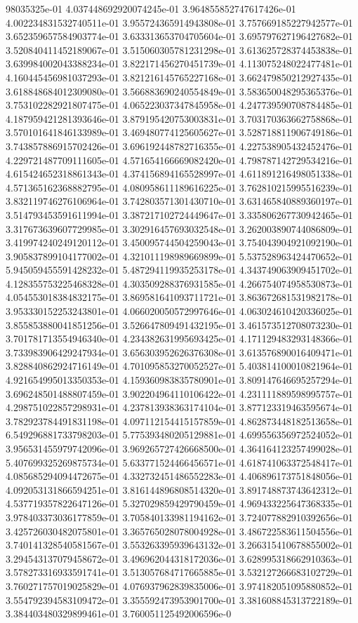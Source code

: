 98035325e-01	4.037448692920074245e-01	3.964855852747617426e-01	4.002234831532740511e-01	3.955724365914943808e-01	3.757669185227942577e-01	3.652359657584903774e-01	3.633313653704705604e-01	3.695797627196427682e-01	3.520840411452189067e-01	3.515060305781231298e-01	3.613625728374453838e-01	3.639984002043388234e-01	3.822171456270451739e-01	4.113075248022477481e-01	4.160445456981037293e-01	3.821216145765227168e-01	3.662479850212927435e-01	3.618848684012309080e-01	3.566883690240554849e-01	3.583650048295365376e-01	3.753102282921807475e-01	4.065223037347845958e-01	4.247739590708784485e-01	4.187959421281393646e-01	3.879195420753003831e-01	3.703170363662758868e-01	3.570101641846133989e-01	3.469480774125605627e-01	3.528718811906749186e-01	3.743857886915702426e-01	3.696192448782716355e-01	4.227538905432452476e-01	4.229721487709111605e-01	4.571654166669082420e-01	4.798787142729534216e-01	4.615424652318861343e-01	4.374156894165528997e-01	4.611891216498051338e-01	4.571365162368882795e-01	4.080958611189616225e-01	3.762810215995516239e-01	3.832119746276106964e-01	3.742803571301430710e-01	3.631465840889360197e-01	3.514793453591611994e-01	3.387217102724449647e-01	3.335806267730942465e-01	3.317673639607729985e-01	3.302916457693032548e-01	3.262003890744086809e-01	3.419974240249120112e-01	3.450095744504259043e-01	3.754043904921092190e-01	3.905837899104177002e-01	4.321011198989669899e-01	5.537528963424470652e-01	5.945059455591428232e-01	5.487294119935253178e-01	4.343749063909451702e-01	4.128355753225468328e-01	4.303509288376931585e-01	4.266754074958530873e-01	4.054553018384832175e-01	3.869581641093711721e-01	3.863672681531982178e-01	3.953330152253243801e-01	4.066020050572997646e-01	4.063024610420336025e-01	3.855853880041851256e-01	3.526647809491432195e-01	3.461573512708073230e-01	3.701781713554946340e-01	4.234382631995693425e-01	4.171129483293148366e-01	3.733983906429247934e-01	3.656303952626376308e-01	3.613576890016409471e-01	3.828840862924716149e-01	4.701095853270052527e-01	5.403814100010821964e-01	4.921654995013350353e-01	4.159360983835780901e-01	3.809147646695257294e-01	3.696248501488807459e-01	3.902204964110106422e-01	4.231111889598995757e-01	4.298751022857298931e-01	4.237813938363174104e-01	3.877123319463595674e-01	3.782923784491831198e-01	4.097112154415157859e-01	4.862873448182513658e-01	6.549296881733798203e-01	5.775393480205129881e-01	4.699556356972524052e-01	3.956531455979742096e-01	3.969265727426668500e-01	4.364164123257499028e-01	5.407699325269875734e-01	5.633771524466456571e-01	4.618741063372548417e-01	4.085685294094472675e-01	4.332732451486552283e-01	4.406896173751848056e-01	4.092053131866594251e-01	3.816144896808514320e-01	3.891748873743642312e-01	4.537719357822647126e-01	5.327029859429790459e-01	4.969433225647368335e-01	3.978403373036177859e-01	3.705840133981194162e-01	3.724077882910392656e-01	3.425726030482075801e-01	3.365765028078004928e-01	3.486722583611504556e-01	3.740141328540581567e-01	3.553263395939643132e-01	3.266315410678855002e-01	3.294543137079458672e-01	3.496962044318172036e-01	3.628995318662910363e-01	3.578273316933591741e-01	3.513057684717665885e-01	3.532127266683102729e-01	3.760271757019025829e-01	4.076937962839835006e-01	3.974182051095880852e-01	3.554792394583109472e-01	3.355592473953901700e-01	3.381608845313722189e-01	3.384403480329899461e-01	3.760051125492006596e-0